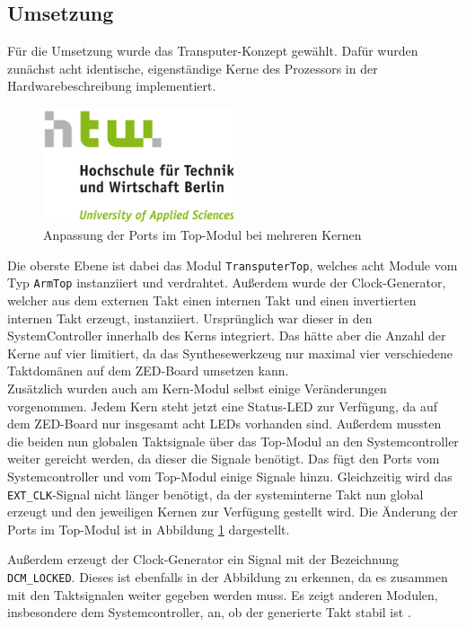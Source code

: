 \documentclass[11pt,a4paper,titlepage]{article}
\begin{document}
\subsection{Umsetzung}

Für die Umsetzung wurde das Transputer-Konzept gewählt. Dafür wurden zunächst acht identische, eigenständige Kerne des Prozessors in der Hardwarebeschreibung implementiert. 

\begin{figure}[H]
\centering
\includegraphics[width=0.5\textwidth]{images/htw_hochschule.png}
\caption{Anpassung der Ports im Top-Modul bei mehreren Kernen}
\label{img:ArmTopPorts}
\end{figure}

Die oberste Ebene ist dabei das Modul \verb+TransputerTop+, welches acht Module vom Typ \verb+ArmTop+ instanziiert und verdrahtet. Außerdem wurde der Clock-Generator, welcher aus dem externen Takt einen internen Takt und einen invertierten internen Takt erzeugt, instanziiert. Ursprünglich war dieser in den SystemController innerhalb des Kerns integriert. Das hätte aber die Anzahl der Kerne auf vier limitiert, da das Synthesewerkzeug nur maximal vier verschiedene Taktdomänen auf dem ZED-Board umsetzen kann.\\

Zusätzlich wurden auch am Kern-Modul selbst einige Veränderungen vorgenommen. Jedem Kern steht jetzt eine Status-LED zur Verfügung, da auf dem ZED-Board nur insgesamt acht LEDs vorhanden sind. Außerdem mussten die beiden nun globalen Taktsignale über das Top-Modul an den Systemcontroller weiter gereicht werden, da dieser die Signale benötigt. Das fügt den Ports vom Systemcontroller und vom Top-Modul einige Signale hinzu. Gleichzeitig wird das \verb+EXT_CLK+-Signal nicht länger benötigt, da der systeminterne Takt nun global erzeugt  und den jeweiligen Kernen zur Verfügung gestellt wird. Die Änderung der Ports im Top-Modul ist in Abbildung \ref{img:ArmTopPorts} dargestellt.

Außerdem erzeugt der Clock-Generator ein Signal mit der Bezeichnung \verb+DCM_LOCKED+. Dieses ist ebenfalls in der Abbildung zu erkennen, da es zusammen mit den Taktsignalen weiter gegeben werden muss. Es zeigt anderen Modulen, insbesondere dem Systemcontroller, an, ob der generierte Takt stabil ist \cite[S. 126]{Boehme}.
\end{document}
